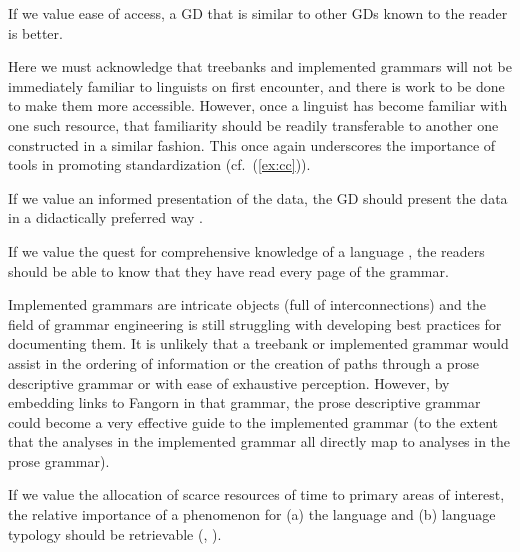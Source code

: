 \documentclass[12pt]{article}
\begin{document}
\begin{exe}
 If we value ease of access, a GD that is similar
to other GDs known to the reader is better.
\end{exe}

Here we must acknowledge that treebanks and implemented grammars
will not be immediately familiar to linguists on first encounter,
and there is work to be done to make them more accessible.  However,
once a linguist has become familiar with one such resource, that
familiarity should be readily transferable to another one constructed
in a similar fashion.  This once again underscores the importance
of tools in promoting standardization (cf.\ (\ref{ex:cc})).

\begin{exe}
 If we value an informed presentation of the data,
the GD should present the data in a didactically preferred way
\cite[401]{Rice:06}.
\end{exe}

\begin{exe}
 If we value the quest
for comprehensive knowledge of a language \cite[162]{Cristofaro:06}, the
readers should be able to know that they have read every page of the grammar.
\end{exe}


Implemented grammars are intricate objects (full of interconnections)
and the field of grammar engineering is still struggling with
developing best practices for documenting them.  It is unlikely that a
treebank or implemented grammar would assist in the ordering of
information or the creation of paths through a prose descriptive
grammar or with ease of exhaustive perception.  However, by embedding
links to Fangorn in that grammar, the prose descriptive
grammar could become a very effective guide to the implemented grammar
(to the extent that the analyses in the implemented grammar all
directly map to analyses in the prose grammar).

\begin{exe}
 If we value the allocation of scarce
resources of time to primary areas of interest, the relative importance
of a phenomenon for (a) the language and (b) language typology should
be retrievable (, ).
\end{exe}
\end{document}
